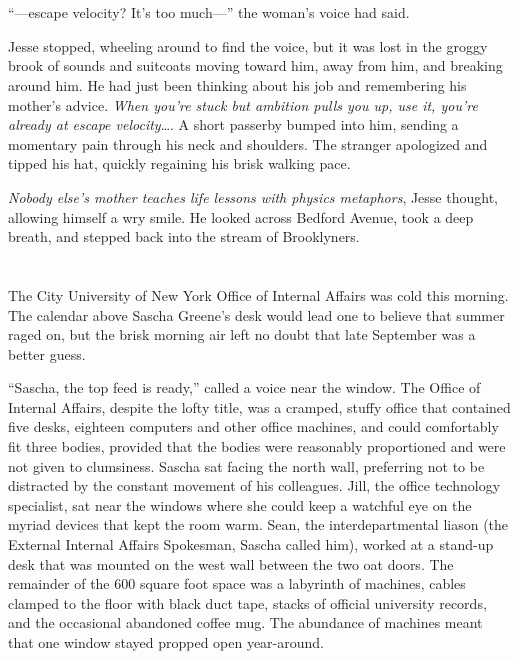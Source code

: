 \documentclass[12pt]{book}
\begin{document}
\chapter{}

``---escape velocity?  It's too much---'' the woman's voice had said.

Jesse stopped, wheeling around to find the voice, but it was lost in the groggy brook of sounds and suitcoats moving toward him, away from him, and breaking around him.  He had just been thinking about his job and remembering his mother's advice.  \emph{When you're stuck but ambition pulls you up, use it, you're already at escape velocity}\dots.  A short passerby bumped into him, sending a momentary pain through his neck and shoulders.  The stranger apologized and tipped his hat, quickly regaining his brisk walking pace.

\emph{Nobody else's mother teaches life lessons with physics metaphors}, Jesse thought, allowing himself a wry smile.  He looked across Bedford Avenue, took a deep breath, and stepped back into the stream of Brooklyners.

\chapter{}

The City University of New York Office of Internal Affairs was cold this morning.  The calendar above Sascha Greene's desk would lead one to believe that summer raged on, but the brisk morning air left no doubt that late September was a better guess.

``Sascha, the top feed is ready,'' called a voice near the window.  The Office of Internal Affairs, despite the lofty title, was a cramped, stuffy office that contained five desks, eighteen computers and other office machines, and could comfortably fit three bodies, provided that the bodies were reasonably proportioned and were not given to clumsiness.  Sascha sat facing the north wall, preferring not to be distracted by the constant movement of his colleagues.  Jill, the office technology specialist, sat near the windows where she could keep a watchful eye on the myriad devices that kept the room warm.  Sean, the interdepartmental liason (the External Internal Affairs Spokesman, Sascha called him), worked at a stand-up desk that was mounted on the west wall between the two oat doors.  The remainder of the 600 square foot space was a labyrinth of machines, cables clamped to the floor with black duct tape, stacks of official university records, and the occasional abandoned coffee mug.  The abundance of machines meant that one window stayed propped open year-around.
\end{document}
